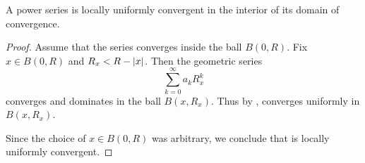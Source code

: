 \begin{proposition}\label{thm:power_series_are_locally_uniform_convergent}
  A power series is locally uniformly convergent in the interior of its domain of convergence.
\end{proposition}
\begin{proof}
  Assume that the series  converges inside the ball \( B(0, R) \). Fix \( x \in B(0, R) \) and \( R_x < R - \left\vert x \right\vert \). Then the geometric series
  \begin{equation*}
    \sum_{k=0}^\infty a_k R_x^k
  \end{equation*}
  converges and dominates  in the ball \( B(x, R_x) \). Thus by ,  converges uniformly in \( B(x, R_x) \).

  Since the choice of \( x \in B(0, R) \) was arbitrary, we conclude that  is locally uniformly convergent.
\end{proof}

